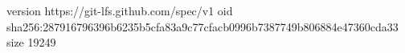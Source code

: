 version https://git-lfs.github.com/spec/v1
oid sha256:287916796396b6235b5cfa83a9c77cfacb0996b7387749b806884e47360cda33
size 19249
